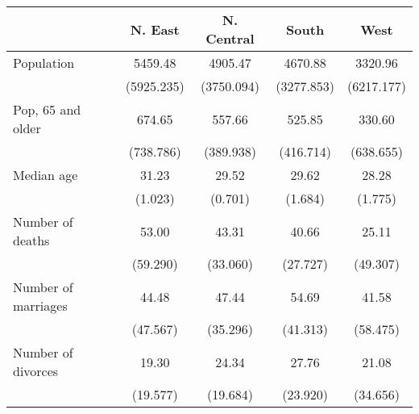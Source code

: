 \begin{tabular}{l*{4}{c}}
\toprule
                &  N. East&N. Central&    South&     West\\
\midrule
Population      &  5459.48&  4905.47&  4670.88&  3320.96\\
                &(5925.235)&(3750.094)&(3277.853)&(6217.177)\\
\addlinespace
Pop, 65 and older&   674.65&   557.66&   525.85&   330.60\\
                &(738.786)&(389.938)&(416.714)&(638.655)\\
\addlinespace
Median age      &    31.23&    29.52&    29.62&    28.28\\
                &  (1.023)&  (0.701)&  (1.684)&  (1.775)\\
\addlinespace
Number of deaths&    53.00&    43.31&    40.66&    25.11\\
                & (59.290)& (33.060)& (27.727)& (49.307)\\
\addlinespace
Number of marriages&    44.48&    47.44&    54.69&    41.58\\
                & (47.567)& (35.296)& (41.313)& (58.475)\\
\addlinespace
Number of divorces&    19.30&    24.34&    27.76&    21.08\\
                & (19.577)& (19.684)& (23.920)& (34.656)\\
\bottomrule
\end{tabular}
